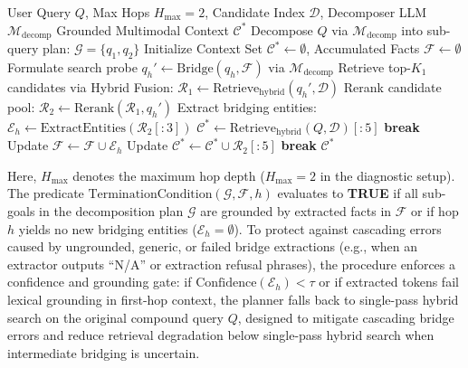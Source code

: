 \documentclass[conference]{IEEEtran}
\begin{document}
\begin{algorithm}[h]
\caption{Multi-Hop Cross-Modal Retrieval Procedure}
\label{alg:multihop}
\begin{algorithmic}[1]
\small
\REQUIRE User Query $Q$, Max Hops $H_{\max}=2$, Candidate Index $\mathcal{D}$, Decomposer LLM $\mathcal{M}_{\text{decomp}}$
\ENSURE Grounded Multimodal Context $\mathcal{C}^*$
\STATE Decompose $Q$ via $\mathcal{M}_{\text{decomp}}$ into sub-query plan: $\mathcal{G} = \{q_1, q_2\}$
\STATE Initialize Context Set $\mathcal{C}^* \leftarrow \emptyset$, Accumulated Facts $\mathcal{F} \leftarrow \emptyset$
    \STATE Formulate search probe $q_h' \leftarrow \text{Bridge}(q_h, \mathcal{F})$ via $\mathcal{M}_{\text{decomp}}$
    \STATE Retrieve top-$K_1$ candidates via Hybrid Fusion: $\mathcal{R}_1 \leftarrow \text{Retrieve}_{\text{hybrid}}(q_h', \mathcal{D})$
    \STATE Rerank candidate pool: $\mathcal{R}_2 \leftarrow \text{Rerank}(\mathcal{R}_1, q_h')$
    \STATE Extract bridging entities: $\mathcal{E}_h \leftarrow \text{ExtractEntities}(\mathcal{R}_2[:3])$
        \STATE {}
        \STATE $\mathcal{C}^* \leftarrow \text{Retrieve}_{\text{hybrid}}(Q, \mathcal{D})[:5]$
        \STATE \textbf{break}
    \ENDIF
    \STATE Update $\mathcal{F} \leftarrow \mathcal{F} \cup \mathcal{E}_h$
    \STATE Update $\mathcal{C}^* \leftarrow \mathcal{C}^* \cup \mathcal{R}_2[:5]$
        \STATE \textbf{break}
    \ENDIF
\ENDFOR
\RETURN $\mathcal{C}^*$
\end{algorithmic}
\end{algorithm}

Here, $H_{\max}$ denotes the maximum hop depth ($H_{\max} = 2$ in the diagnostic setup). The predicate $\text{TerminationCondition}(\mathcal{G}, \mathcal{F}, h)$ evaluates to \textbf{TRUE} if all sub-goals in the decomposition plan $\mathcal{G}$ are grounded by extracted facts in $\mathcal{F}$ or if hop $h$ yields no new bridging entities ($\mathcal{E}_h = \emptyset$). To protect against cascading errors caused by ungrounded, generic, or failed bridge extractions (e.g., when an extractor outputs ``N/A'' or extraction refusal phrases), the procedure enforces a confidence and grounding gate: if $\text{Confidence}(\mathcal{E}_h) < \tau$ or if extracted tokens fail lexical grounding in first-hop context, the planner falls back to single-pass hybrid search on the original compound query $Q$, designed to mitigate cascading bridge errors and reduce retrieval degradation below single-pass hybrid search when intermediate bridging is uncertain.
\end{document}

